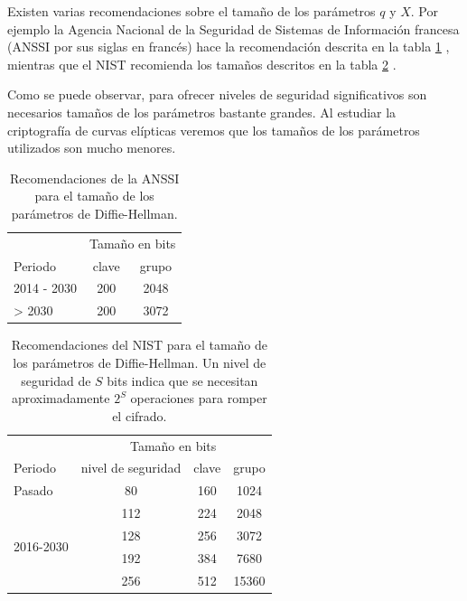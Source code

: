 \documentclass[
  a4paper,
  12pt,
  spanish,
]{scrartcl}
\begin{document}
Existen varias recomendaciones sobre el tamaño de los parámetros \(q\) y \(X\). Por ejemplo la Agencia Nacional de la Seguridad de Sistemas de Información francesa (ANSSI por sus siglas en francés) hace la recomendación descrita en la tabla \ref{tab:tam-anssi} \parencite{anssi_mecanismes_2014}, mientras que el NIST recomienda los tamaños descritos en la tabla \ref{tab:tam-nist} \parencite{barker_recommendation_2016}.

Como se puede observar, para ofrecer niveles de seguridad significativos son necesarios tamaños de los parámetros bastante grandes. Al estudiar la criptografía de curvas elípticas veremos que los tamaños de los parámetros utilizados son mucho menores. 

\begin{table}[h]
  \centering
  \sffamily
  \begin{tabular}{lcc}
    \toprule
    & \multicolumn{2}{c}{Tamaño en bits} \\
    Periodo & clave & grupo \\
    \midrule
    2014 - 2030 & 200 & 2048\\
    > 2030 & 200 & 3072\\
    \bottomrule
  \end{tabular}
  \caption{Recomendaciones de la ANSSI para el tamaño de los parámetros de Diffie-Hellman.}
  \label{tab:tam-anssi}
\end{table}

\begin{table}[h]
  \centering
  \sffamily
  \begin{tabular}{lccc}
    \toprule
     & \multicolumn{3}{c}{Tamaño en bits} \\
    Periodo & nivel de seguridad & clave & grupo \\
    \midrule
    Pasado & 80 & 160 & 1024\\
    \multirow[t]{4}{*}{2016-2030} & 112 & 224 & 2048\\
     & 128 & 256 & 3072\\
     & 192 & 384 & 7680\\
     & 256 & 512 & 15360\\
    \bottomrule
  \end{tabular}
  \caption{Recomendaciones del NIST para el tamaño de los parámetros de Diffie-Hellman. Un nivel de seguridad de \(S\) bits indica que se necesitan aproximadamente \(2^S\) operaciones para romper el cifrado.}
  \label{tab:tam-nist}
\end{table}
\end{document}

